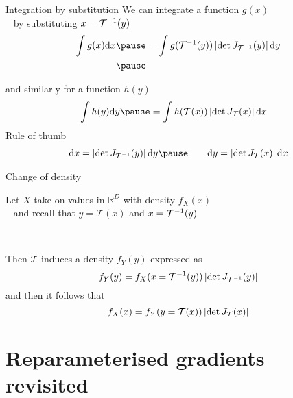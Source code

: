 \documentclass[14pt]{beamer}
\begin{document}
\begin{frame}{Integration by substitution}	
	We can integrate a function $g(x)$ \\
	~ by substituting $x = { \mathcal T}^{-1}(y)$
	\begin{equation*}
	\begin{aligned}
		\int g(x) \dd x \pause &= \int g(\inv{\mathcal T}(y)) \djac{\inv{\mathcal T}}{y} \dd y \\ \pause
	\end{aligned}
	\end{equation*}
	
	\vspace{-10pt} and similarly for a function $h(y)$
	\begin{equation*}
	\begin{aligned}
		\int h(y) \dd y \pause &= \int h(\mathcal T(x)) \djac{\mathcal T}{x} \dd x
	\end{aligned}
	\end{equation*} \pause
	Rule of thumb
	\begin{equation*}
	\begin{aligned}
	\dd x = \djac{\inv{\mathcal T}}{y} \dd y \pause \qquad \dd y = \djac{\mathcal T}{x} \dd x
	\end{aligned}
	\end{equation*}

\end{frame}

\begin{frame}{Change of density}

Let $X$ take on values in $\mathbb R^D$ with density $f_X(x)$\\ \pause
~ and recall that $y = \mathcal T(x)$ and $x = {\mathcal T}^{-1}(y)$\\ \pause

~

Then $\mathcal T$ induces a density $f_Y(y)$ expressed as
\begin{equation*}
f_Y(y) = f_X(x = {\mathcal T}^{-1}(y)) \left| \det J_{{\mathcal T}^{-1}}(y) \right|
\end{equation*} \pause
and then it follows that
\begin{equation*}
f_X(x) = f_Y(y=\mathcal T(x)) \left| \det J_{\mathcal T}(x) \right|
\end{equation*}

	
\end{frame}

\section{Reparameterised gradients revisited}
\end{document}
